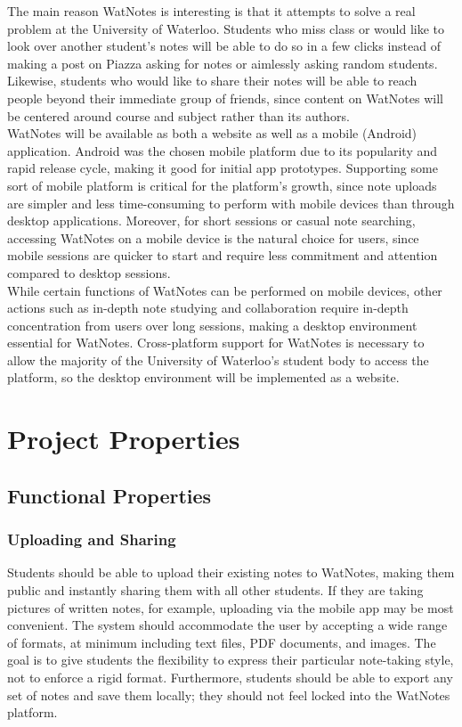\documentclass[12pt]{article}
\begin{document}
  The main reason WatNotes is interesting is that it attempts to solve a real problem at the University of Waterloo. Students who miss class or would like to look over another student's notes will be able to do so in a few clicks instead of making a post on Piazza asking for notes or aimlessly asking random students. Likewise, students who would like to share their notes will be able to reach people beyond their immediate group of friends, since content on WatNotes will be centered around course and subject rather than its authors. \\

WatNotes will be available as both a website as well as a mobile (Android) application. Android was the chosen mobile platform due to its popularity and rapid release cycle, making it good for initial app prototypes. Supporting some sort of mobile platform is critical for the platform's growth, since note uploads are simpler and less time-consuming to perform with mobile devices than through desktop applications. Moreover, for short sessions or casual note searching, accessing WatNotes on a mobile device is the natural choice for users, since mobile sessions are quicker to start and require less commitment and attention compared to desktop sessions. \\

While certain functions of WatNotes can be performed on mobile devices, other actions such as in-depth note studying and collaboration require in-depth concentration from users over long sessions, making a desktop environment essential for WatNotes. Cross-platform support for WatNotes is necessary to allow the majority of the University of Waterloo's student body to access the platform, so the desktop environment will be implemented as a website. \\
\newpage

\section{Project Properties}
\subsection{Functional Properties}
  \subsubsection{Uploading and Sharing}
  Students should be able to upload their existing notes to WatNotes, making them public and instantly sharing them with all other students. If they are taking pictures of written notes, for example, uploading via the mobile app may be most convenient. The system should accommodate the user by accepting a wide range of formats, at minimum including text files, PDF documents, and images. The goal is to give students the flexibility to express their particular note-taking style, not to enforce a rigid format. Furthermore, students should be able to export any set of notes and save them locally; they should not feel locked into the WatNotes platform.
\end{document}
